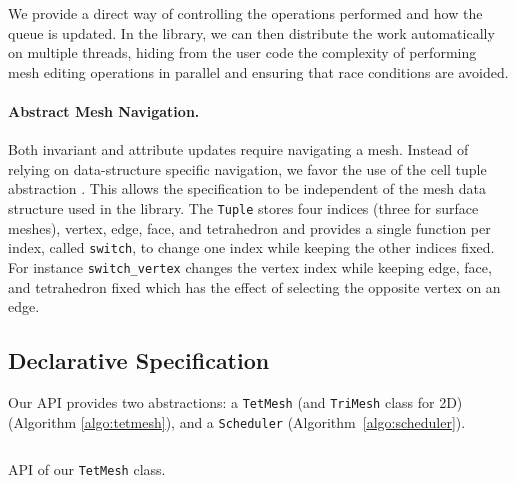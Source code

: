 We provide a direct way of controlling the operations performed and how the queue is updated. In the library, we can then distribute the work automatically on multiple threads, hiding from the user code the complexity of performing mesh editing operations in parallel and ensuring that race conditions are avoided. 

\paragraph{Abstract Mesh Navigation.}
Both invariant and attribute updates require navigating a mesh. Instead of relying on data-structure specific navigation, we favor the use of the cell tuple abstraction \cite{Brisson1989}. This allows the specification to be independent of the mesh data structure used in the library. The \texttt{Tuple} stores four indices  (three for surface meshes), vertex, edge, face, and tetrahedron and provides a single function per index, called \texttt{switch}, to change one index while keeping the other indices fixed. For instance \texttt{switch\_vertex} changes the vertex index while keeping edge, face, and tetrahedron fixed which has the effect of selecting the opposite vertex on an edge.

\subsection{Declarative Specification}


Our API provides two abstractions: a \texttt{TetMesh} (and \texttt{TriMesh} class for 2D) (Algorithm \ref{algo:tetmesh}), and a \texttt{Scheduler} (Algorithm~\ref{algo:scheduler}).

\begin{longlisting}
\inputminted{cpp}{wmtk-tex/code/tetmesh.cpp}
\caption{API of our \texttt{TetMesh} class.}
\label{algo:tetmesh}
\end{longlisting}



